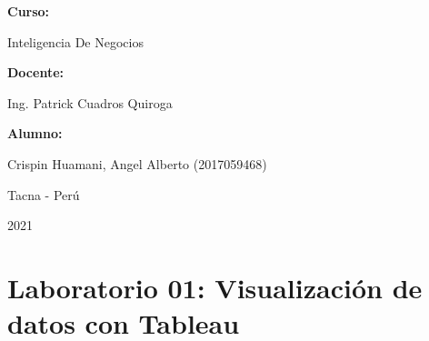 \documentclass[12pt,letterpaper]{article}
\begin{document}
\begin{titlepage}
\begin{center}
\vspace*{0.3in}
\begin{Large}
\textbf{Curso:} \\
\end{Large}

\vspace*{0.1in}
\begin{large}
    Inteligencia De Negocios\\
\end{large}

\vspace*{0.3in}
\begin{Large}
\textbf{Docente:} \\
\end{Large}

\vspace*{0.1in}
\begin{large}
Ing. Patrick Cuadros Quiroga\\
\end{large}

\vspace*{0.2in}
\vspace*{0.1in}
\begin{large}
\textbf{Alumno:} \\
\begin{flushleft}
    Crispin Huamani, Angel Alberto		\hfill	(2017059468) \\


\end{flushleft}
\end{large}
\vspace*{0.1in}
\begin{large}
Tacna - Perú\\
\end{large}
\vspace*{0.1in}
\begin{large}
2021\\
\end{large}

\end{center}

\end{titlepage}



\tableofcontents %
\thispagestyle{empty} %
\newpage
\setcounter{page}{1} %



\section*{Laboratorio 01: Visualización de datos con Tableau}
\end{document}
